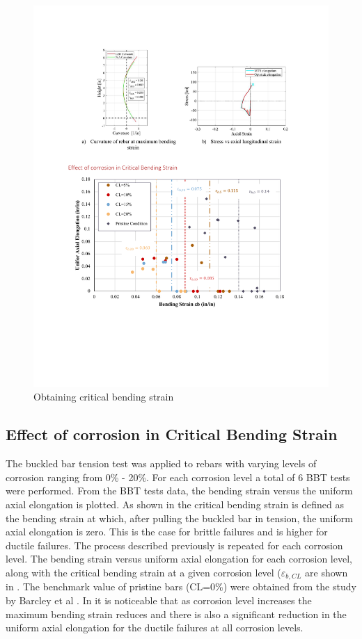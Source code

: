 \begin{figure}[htbp]
	\centering
	\includegraphics[width=1\textwidth]{VAC Thesis 2.0/Chapter-4/figs/BBT_curvature.pdf}
	\caption{Obtaining critical bending strain}
	\label{fig:bendingstrain}
\end{figure}

\subsection{Effect of corrosion in Critical Bending Strain}

The buckled bar tension test was applied to rebars with varying levels of corrosion ranging from 0\% - 20\%. For each corrosion level a total of 6 BBT tests were performed. From the BBT tests data, the bending strain versus the uniform axial elongation is plotted. As shown in  the critical bending strain is defined as the bending strain at which, after pulling the buckled bar in  tension, the uniform axial elongation is zero. This is the case for brittle failures and is higher for ductile failures. The process described previously is repeated for each corrosion level. The bending strain versus uniform axial elongation for each corrosion level, along with the critical bending strain at a given corrosion level ($\varepsilon_{b,CL}$ are shown in  . The benchmark value of pristine bars (CL=0\%) were obtained from the study by Barcley et al \cite{Barcley2018}. In  it is noticeable that as corrosion level increases the maximum bending strain reduces and there is also a significant reduction in the uniform axial elongation for the ductile failures at all corrosion levels.

